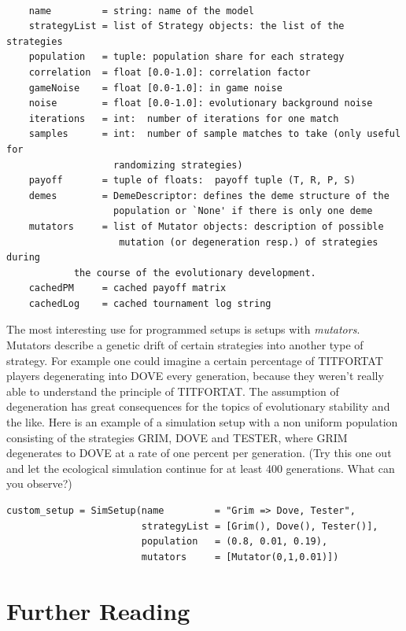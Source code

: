 \documentclass[12pt,a4paper,USenglish]{article}
\begin{document}
\begin{verbatim}

    name         = string: name of the model
    strategyList = list of Strategy objects: the list of the strategies
    population   = tuple: population share for each strategy
    correlation  = float [0.0-1.0]: correlation factor
    gameNoise    = float [0.0-1.0]: in game noise
    noise        = float [0.0-1.0]: evolutionary background noise
    iterations   = int:  number of iterations for one match
    samples      = int:  number of sample matches to take (only useful for 
                   randomizing strategies)
    payoff       = tuple of floats:  payoff tuple (T, R, P, S)
    demes        = DemeDescriptor: defines the deme structure of the
                   population or `None' if there is only one deme
    mutators     = list of Mutator objects: description of possible
                    mutation (or degeneration resp.) of strategies during 
		    the course of the evolutionary development.
    cachedPM     = cached payoff matrix
    cachedLog    = cached tournament log string

\end{verbatim}

The most interesting use for programmed setups is setups with
\emph{mutators}. Mutators describe a genetic drift of certain strategies 
into another type of strategy. For
example one could imagine a certain percentage of TITFORTAT players
degenerating into DOVE every generation, because they weren't really
able to understand the principle of TITFORTAT. The assumption of
degeneration has great consequences for the topics of evolutionary
stability and the like. Here is an example of a simulation setup
with a non uniform population consisting of the strategies GRIM, DOVE
and TESTER, where GRIM degenerates to DOVE at a rate of one percent per
generation. (Try this one out and let the ecological simulation
continue for at least 400 generations. What can you observe?)

\begin{verbatim}
custom_setup = SimSetup(name         = "Grim => Dove, Tester",
                        strategyList = [Grim(), Dove(), Tester()],     
                        population   = (0.8, 0.01, 0.19), 
                        mutators     = [Mutator(0,1,0.01)])
\end{verbatim}


\section{Further Reading}
\end{document}
